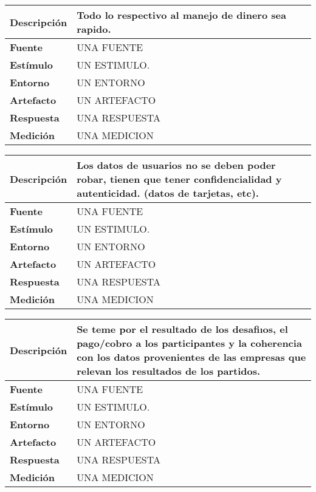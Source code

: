 \begin{center}
  \begin{tabular}{| l | p{10cm} | }
    \hline
  \textbf{Descripción} & Todo lo respectivo al manejo de dinero sea rapido.\\  \hline
  \textbf{Fuente} & UNA FUENTE\\  \hline
  \textbf{Estímulo} & UN ESTIMULO.\\  \hline
  \textbf{Entorno} & UN ENTORNO\\  \hline
  \textbf{Artefacto} & UN ARTEFACTO\\  \hline
  \textbf{Respuesta} & UNA RESPUESTA\\  \hline
  \textbf{Medición} & UNA MEDICION\\  \hline
  \end{tabular}
\end{center} 

\begin{center}
  \begin{tabular}{| l | p{10cm} | }
    \hline
  \textbf{Descripción} & Los datos de usuarios no se deben poder robar, tienen que tener confidencialidad y autenticidad. (datos de tarjetas, etc). \\  \hline
  \textbf{Fuente} & UNA FUENTE\\  \hline
  \textbf{Estímulo} & UN ESTIMULO.\\  \hline
  \textbf{Entorno} & UN ENTORNO\\  \hline
  \textbf{Artefacto} & UN ARTEFACTO\\  \hline
  \textbf{Respuesta} & UNA RESPUESTA\\  \hline
  \textbf{Medición} & UNA MEDICION\\  \hline
  \end{tabular}
\end{center} 

\begin{center}
  \begin{tabular}{| l | p{10cm} | }
    \hline
  \textbf{Descripción} & Se teme por el resultado de los desafiıos, el pago/cobro a los participantes y la coherencia con los datos provenientes de las empresas que relevan los resultados de los partidos. \\  \hline
  \textbf{Fuente} & UNA FUENTE\\  \hline
  \textbf{Estímulo} & UN ESTIMULO.\\  \hline
  \textbf{Entorno} & UN ENTORNO\\  \hline
  \textbf{Artefacto} & UN ARTEFACTO\\  \hline
  \textbf{Respuesta} & UNA RESPUESTA\\  \hline
  \textbf{Medición} & UNA MEDICION\\  \hline
  \end{tabular}
\end{center} 

